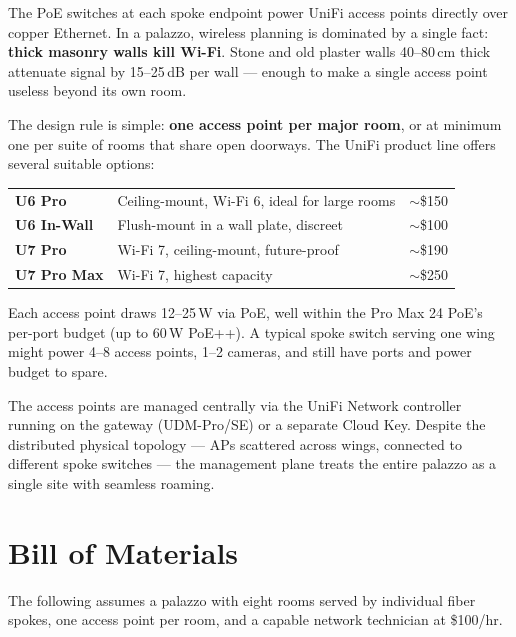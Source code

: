 \documentclass[10pt, letterpaper]{article}
\begin{document}
The PoE switches at each spoke endpoint power UniFi access points directly over copper Ethernet. In a palazzo, wireless planning is dominated by a single fact: \textbf{thick masonry walls kill Wi-Fi}. Stone and old plaster walls 40--80\,cm thick attenuate signal by 15--25\,dB per wall --- enough to make a single access point useless beyond its own room.

The design rule is simple: \textbf{one access point per major room}, or at minimum one per suite of rooms that share open doorways. The UniFi product line offers several suitable options:

\begin{metricbox}
\begin{tabularx}{\textwidth}{@{} >{\bfseries}l X r @{}}
U6 Pro & Ceiling-mount, Wi-Fi 6, ideal for large rooms & $\sim$\$150 \\
U6 In-Wall & Flush-mount in a wall plate, discreet & $\sim$\$100 \\
U7 Pro & Wi-Fi 7, ceiling-mount, future-proof & $\sim$\$190 \\
U7 Pro Max & Wi-Fi 7, highest capacity & $\sim$\$250 \\
\end{tabularx}
\end{metricbox}

Each access point draws 12--25\,W via PoE, well within the Pro Max 24 PoE's per-port budget (up to 60\,W PoE++). A typical spoke switch serving one wing might power 4--8 access points, 1--2 cameras, and still have ports and power budget to spare.

The access points are managed centrally via the UniFi Network controller running on the gateway (UDM-Pro/SE) or a separate Cloud Key. Despite the distributed physical topology --- APs scattered across wings, connected to different spoke switches --- the management plane treats the entire palazzo as a single site with seamless roaming.

\section{Bill of Materials}

The following assumes a palazzo with eight rooms served by individual fiber spokes, one access point per room, and a capable network technician at \$100/hr.
\end{document}
